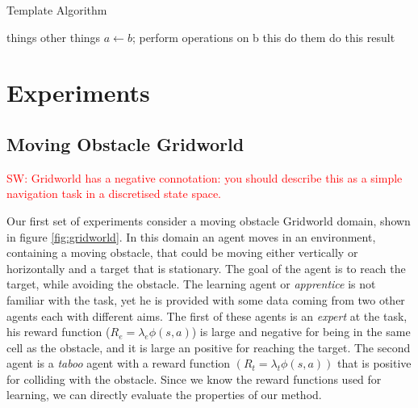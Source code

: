 \documentclass[letterpaper]{article}
\newcommand{\sw}[1]{\textcolor{red}{SW: #1}}
\newcommand{\sw}[1]{}
\begin{document}

\begin{algorithm}[h]
\caption{Template Algorithm}
\label{alg:lff}
\begin{algorithmic}[1]
\REQUIRE things
\ENSURE other things
\STATE $a \gets b$;
\STATE perform operations on b
\STATE this
\STATE do them
\STATE do this
\ENDIF
\ENDFOR
\ENDWHILE
\RETURN result
\end{algorithmic}
\end{algorithm}

\section{Experiments}
\subsection{Moving Obstacle Gridworld}

\sw{Gridworld has a negative connotation: you should describe this as a simple navigation task in a discretised state space.}

Our first set of experiments consider a moving obstacle Gridworld domain, shown in figure \ref{fig:gridworld}.
In this domain an agent moves in an environment, containing a moving obstacle, that could be moving either vertically
or horizontally and a target that is stationary. The goal of the agent is to reach the target, while avoiding 
the obstacle. The learning agent or \emph{apprentice} is not familiar with the task, yet he is provided with some data coming from two other agents
each with different aims. The first of these agents is an \emph{expert} at the task, his reward function ($R_e = \lambda_e\phi(s,a)$) is large and negative
for being in the same cell as the obstacle, and it is large an positive for reaching the target. The second agent is a
\emph{taboo} agent with a reward function $(R_t=\lambda_t\phi(s,a))$ that is positive for colliding with the obstacle. Since we know the reward functions used for learning, we can directly evaluate the properties of our method. 
\end{document}
